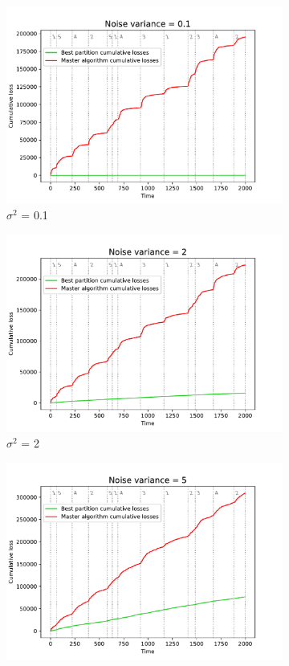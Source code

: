\documentclass[12pt, twoside]{article}
\begin{document}
\begin{figure}[htb]
    \centering %
\begin{subfigure}{0.33\textwidth}
  \includegraphics[width=\linewidth]{noise_0.1}
  \caption{$\sigma^2$ = 0.1}
  \label{fig:1}
\end{subfigure}\hfil %
\begin{subfigure}{0.33\textwidth}
  \includegraphics[width=\linewidth]{noise_2}
  \caption{$\sigma^2$ = 2}
  \label{fig:2}
\end{subfigure}\hfil %
\begin{subfigure}{0.33\textwidth}
  \includegraphics[width=\linewidth]{noise_5}

\end{subfigure}
\end{figure}
\end{document}
